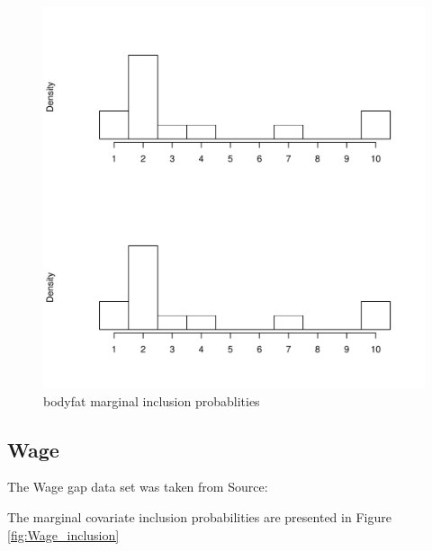 \documentclass{amsart}[12pt]
\begin{document}
\begin{figure}[p]
\label{fig:bodyfat_inclusion}
\caption{bodyfat marginal inclusion probablities}
\includegraphics[scale=.4]{bodyfat_histogram.pdf}
\end{figure}

\subsection{Wage}
The Wage gap data set was taken from Source: \cite{James:2014:ISL:2517747}

The marginal covariate inclusion probabilities are presented in Figure \ref{fig:Wage_inclusion}

\end{document}
